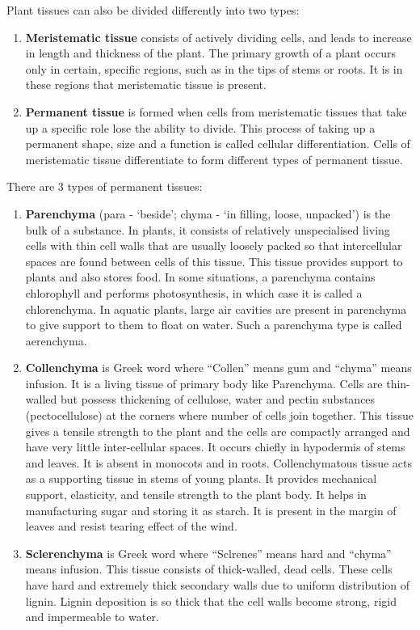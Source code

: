 \documentclass[]{book}
\providecommand{\tightlist}{%
  \setlength{\itemsep}{0pt}\setlength{\parskip}{0pt}}
\theoremstyle{definition}
\theoremstyle{definition}
\theoremstyle{definition}
\theoremstyle{remark}
\begin{document}
\begin{enumerate}
Plant tissues can also be divided differently into two types:

\begin{enumerate}
\def\labelenumi{\arabic{enumi}.}
\tightlist
\item
  \textbf{Meristematic tissue} consists of actively dividing cells, and
  leads to increase in length and thickness of the plant. The primary
  growth of a plant occurs only in certain, specific regions, such as in
  the tips of stems or roots. It is in these regions that meristematic
  tissue is present.
\item
  \textbf{Permanent tissue} is formed when cells from meristematic
  tissues that take up a specific role lose the ability to divide. This
  process of taking up a permanent shape, size and a function is called
  cellular differentiation. Cells of meristematic tissue differentiate
  to form different types of permanent tissue.
\end{enumerate}

There are 3 types of permanent tissues:

\begin{enumerate}
\def\labelenumi{\arabic{enumi}.}
\tightlist
\item
  \textbf{Parenchyma} (para - `beside'; chyma - `in filling, loose,
  unpacked') is the bulk of a substance. In plants, it consists of
  relatively unspecialised living cells with thin cell walls that are
  usually loosely packed so that intercellular spaces are found between
  cells of this tissue. This tissue provides support to plants and also
  stores food. In some situations, a parenchyma contains chlorophyll and
  performs photosynthesis, in which case it is called a chlorenchyma. In
  aquatic plants, large air cavities are present in parenchyma to give
  support to them to float on water. Such a parenchyma type is called
  aerenchyma.
\item
  \textbf{Collenchyma} is Greek word where ``Collen'' means gum and
  ``chyma'' means infusion. It is a living tissue of primary body like
  Parenchyma. Cells are thin-walled but possess thickening of cellulose,
  water and pectin substances (pectocellulose) at the corners where
  number of cells join together. This tissue gives a tensile strength to
  the plant and the cells are compactly arranged and have very little
  inter-cellular spaces. It occurs chiefly in hypodermis of stems and
  leaves. It is absent in monocots and in roots. Collenchymatous tissue
  acts as a supporting tissue in stems of young plants. It provides
  mechanical support, elasticity, and tensile strength to the plant
  body. It helps in manufacturing sugar and storing it as starch. It is
  present in the margin of leaves and resist tearing effect of the wind.
\item
  \textbf{Sclerenchyma} is Greek word where ``Sclrenes'' means hard and
  ``chyma'' means infusion. This tissue consists of thick-walled, dead
  cells. These cells have hard and extremely thick secondary walls due
  to uniform distribution of lignin. Lignin deposition is so thick that
  the cell walls become strong, rigid and impermeable to water.
\end{enumerate}


\end{enumerate}
\end{document}
